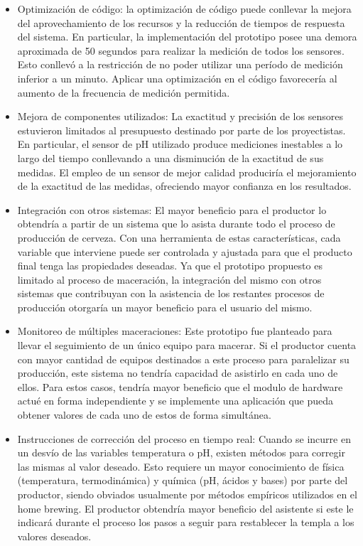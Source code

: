 \begin{itemize}
    \item Optimización de código: la optimización de código puede conllevar la mejora del aprovechamiento de los recursos y la reducción de tiempos de respuesta del sistema. En particular, la implementación del prototipo posee una demora aproximada de 50 segundos para realizar la medición de todos los sensores. Esto conllevó a la restricción de no poder utilizar una período de medición inferior a un minuto. Aplicar una optimización en el código favorecería al aumento de la frecuencia de medición permitida.
    
    \item Mejora de componentes utilizados: La exactitud y precisión de los sensores estuvieron limitados al presupuesto destinado por parte de los proyectistas. En particular, el sensor de pH utilizado produce mediciones inestables a lo largo del tiempo conllevando a una disminución de la exactitud de sus medidas. El empleo de un sensor de mejor calidad produciría el mejoramiento de la exactitud de las medidas, ofreciendo mayor confianza en los resultados.
    
    \item Integración con otros sistemas: El mayor beneficio para el productor lo obtendría a partir de un sistema que lo asista durante todo el proceso de producción de cerveza. Con una herramienta de estas características, cada variable que interviene puede ser controlada y ajustada para que el producto final tenga las propiedades deseadas. Ya que el prototipo propuesto es limitado al proceso de maceración, la integración del mismo con otros sistemas que contribuyan con la asistencia de los restantes procesos de producción otorgaría un mayor beneficio para el usuario del mismo.
    
    \item Monitoreo de múltiples maceraciones: Este prototipo fue planteado para llevar el seguimiento de un único equipo para macerar. Si el productor cuenta con mayor cantidad de equipos destinados a este proceso para paralelizar su producción, este sistema no tendría capacidad de asistirlo en cada uno de ellos. Para estos casos, tendría mayor beneficio que el modulo de hardware actué en forma independiente y se implemente una aplicación que pueda obtener valores de cada uno de estos de forma simultánea.
    
    \item Instrucciones de corrección del proceso en tiempo real: Cuando se incurre en un desvío de las variables temperatura o pH, existen métodos para corregir las mismas al valor deseado. Esto requiere un mayor conocimiento de física (temperatura, termodinámica) y química (pH, ácidos y bases) por parte del productor, siendo obviados usualmente por métodos empíricos utilizados en el home brewing. El productor obtendría mayor beneficio del asistente si este le indicará durante el proceso los pasos a seguir para restablecer la templa a los valores deseados.
    

\end{itemize}
